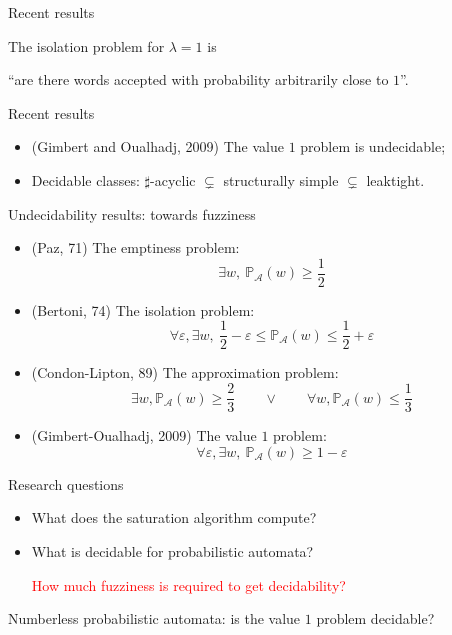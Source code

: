 \documentclass[svgnames]{beamer}
\newcommand{\prob}[1]{\mathbb{P}_{#1}}
\newcommand{\A}{\mathcal{A}}
\begin{document}
\begin{frame}{Recent results}

The isolation problem for $\lambda = 1$ is
\begin{center}
``are there words accepted with probability arbitrarily close to $1$''.
\end{center}

\pause
\begin{block}{Recent results}
	\begin{itemize}
		\item (Gimbert and Oualhadj, 2009) The value $1$ problem is undecidable;
		\item Decidable classes: $\sharp$-acyclic $\subsetneq$ structurally simple $\subsetneq$ leaktight.
	\end{itemize}
\end{block}
\end{frame}


\begin{frame}{Undecidability results: towards fuzziness}

\begin{itemize}
	\item (Paz, 71) The emptiness problem:
	\[
	\exists w,\ \prob{\A}(w) \ge \frac{1}{2}
	\]
	\item (Bertoni, 74) The isolation problem:
	\[
	\forall \varepsilon, \exists w,\ \frac{1}{2} - \varepsilon \le \prob{\A}(w) \le \frac{1}{2} + \varepsilon
	\]	
	\item (Condon-Lipton, 89) The approximation problem:
	\[
	\exists w, \prob{\A}(w) \ge \frac{2}{3} \qquad \vee \qquad \forall w, \prob{\A}(w) \le \frac{1}{3}
	\]
	\item (Gimbert-Oualhadj, 2009) The value $1$ problem:
	\[
	\forall \varepsilon, \exists w,\ \prob{\A}(w) \ge 1 - \varepsilon
	\]
\end{itemize}
\end{frame}

\begin{frame}{Research questions}
\begin{block}{}
	\begin{itemize}
		\item What does the saturation algorithm compute?
		\item What is decidable for probabilistic automata? 

		\textcolor{red}{		
		How much fuzziness is required to get decidability?
		}
	\end{itemize}
\end{block}

Numberless probabilistic automata: is the value $1$ problem decidable?
\end{frame}
\end{document}
